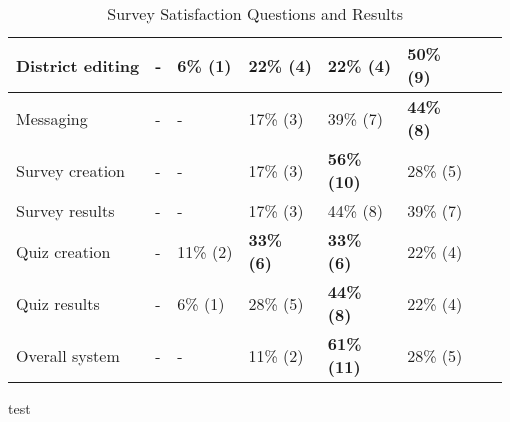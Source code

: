\begin{table}
{\begin{tabular}{| L{8cm} |p{0.7cm}|p{0.7cm}|p{0.7cm}|p{0.7cm}|p{0.7cm}|p{0.7cm}|p{0.7cm}|}
\hline District editing
	& - & 6\% \newline (1) & 22\% \newline (4) & 22\% \newline (4) & \textbf{50\% \newline (9)} \\
\hline Messaging
	& - & - & 17\% \newline (3) & 39\% \newline (7) & \textbf{44\% \newline (8)} \\
\hline Survey creation
	& - & - & 17\% \newline (3) & \textbf{56\% \newline (10)} & 28\% \newline (5) \\
\hline Survey results
	& - & - & 17\% \newline (3) & 44\% \newline (8) & 39\% \newline (7) \\
\hline Quiz creation
	& - & 11\% \newline (2) & \textbf{33\% \newline (6)} & \textbf{33\% \newline (6)} & 22\% \newline (4) \\
\hline Quiz results
	& - & 6\% \newline (1) & 28\% \newline (5) & \textbf{44\% \newline (8)} & 22\% \newline (4) \\
\hline Overall system
	& - & - & 11\% \newline (2) & \textbf{61\% \newline (11)} & 28\% \newline (5) \\
\hline
\end{tabular}
}
\caption{Survey Satisfaction Questions and Results}
\label{table:satisfaction}
\end{table}

test